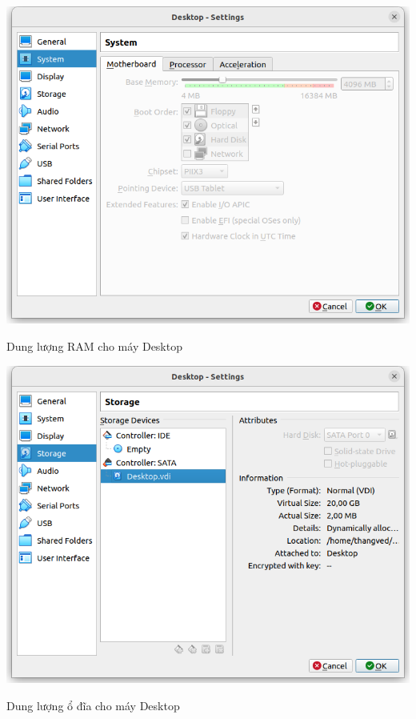 \documentclass[a4paper, 11pt]{article}
\begin{document}
\begin{enumerate}
          \begin{minipage}
              {\linewidth}
              \captionsetup{type=figure}
              \centering
              \includegraphics[width=\linewidth]{images/desktop-ram.png}
              \caption{Dung lượng RAM cho máy Desktop}
              \label{figure:desktop-ram}
          \end{minipage}

          \begin{minipage}
              {\linewidth}
              \captionsetup{type=figure}
              \centering
              \includegraphics[width=\linewidth]{images/desktop-disk.png}
              \caption{Dung lượng ổ đĩa cho máy Desktop}
              \label{figure:desktop-disk}
          \end{minipage}


\end{enumerate}
\end{document}
